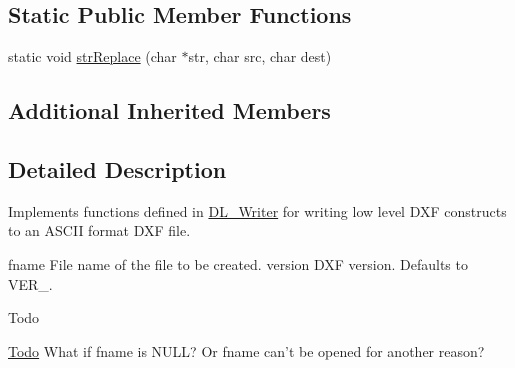 \subsection*{Static Public Member Functions}
\begin{DoxyCompactItemize}
\item 
static void \hyperlink{classDL__WriterA_acef58eea4f7599463bf0593133a134f3}{str\-Replace} (char $\ast$str, char src, char dest)
\end{DoxyCompactItemize}
\subsection*{Additional Inherited Members}


\subsection{Detailed Description}
Implements functions defined in \hyperlink{classDL__Writer}{D\-L\-\_\-\-Writer} for writing low level D\-X\-F constructs to an A\-S\-C\-I\-I format D\-X\-F file.

fname File name of the file to be created.  version D\-X\-F version. Defaults to V\-E\-R\-\_.

\begin{DoxyRefDesc}{Todo}
\item[\hyperlink{todo__todo000005}{Todo}]What if {\ttfamily fname} is N\-U\-L\-L? Or {\ttfamily fname} can't be opened for another reason? \end{DoxyRefDesc}


